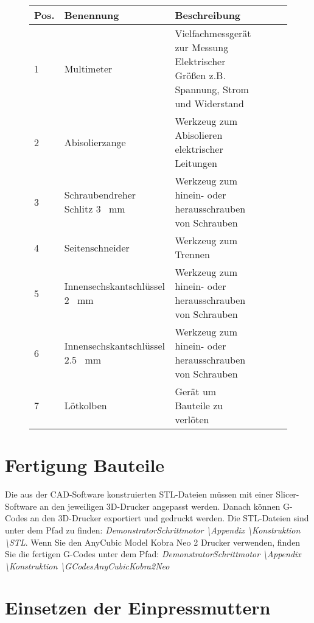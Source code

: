 \begin{figure}[H]
	\begin{center}
		\fontsize{8}{10}\selectfont
		\begin{tabularx}{\textwidth}{|p{0.4cm}|p{3.4cm}|X|X|X|X|} 
			\hline 
			\textbf{Pos.} &  \textbf{Benennung} &  \textbf{Beschreibung}\\ \hline
			1 & Multimeter & Vielfachmessgerät zur Messung Elektrischer Größen z.B. Spannung, Strom und Widerstand  \\ \hline
			2 & Abisolierzange & Werkzeug zum Abisolieren elektrischer Leitungen  \\ \hline
			3 & Schraubendreher Schlitz 3 \ mm & Werkzeug zum hinein- oder herausschrauben von Schrauben \\ \hline
			4 & Seitenschneider & Werkzeug zum Trennen  \\ \hline
			5 & Innensechskantschlüssel 2 \ mm &  Werkzeug zum hinein- oder herausschrauben von Schrauben \\ \hline
			6 & Innensechskantschlüssel 2.5 \ mm &  Werkzeug zum hinein- oder herausschrauben von Schrauben \\ \hline
			7 & Lötkolben &  Gerät um Bauteile zu verlöten \\ \hline

		\end{tabularx}
			\label{WerkTab}
	\end{center}
\end{figure}

\section{Fertigung Bauteile}

Die aus der CAD-Software konstruierten STL-Dateien müssen mit einer Slicer-Software an den jeweiligen 3D-Drucker angepasst werden. Danach können G-Codes an den 3D-Drucker exportiert und gedruckt werden. Die STL-Dateien sind unter dem Pfad zu finden: \emph{DemonstratorSchrittmotor \textbackslash Appendix \textbackslash Konstruktion \textbackslash STL}.  Wenn Sie den AnyCubic Model Kobra Neo 2 Drucker verwenden, finden Sie die fertigen G-Codes unter dem Pfad: \emph{DemonstratorSchrittmotor \textbackslash Appendix \textbackslash Konstruktion \textbackslash GCodesAnyCubicKobra2Neo}

\section{Einsetzen der Einpressmuttern}

